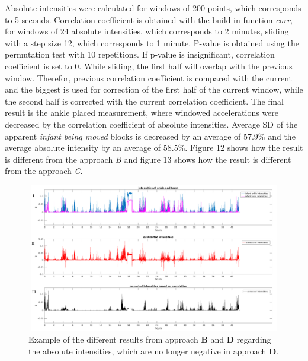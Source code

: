\documentclass{article}
\begin{document}
{Absolute intensities were calculated for windows of 200 points, which corresponds to 5 seconds. Correlation coefficient is obtained with the build-in function \textit{corr}, for windows of 24 absolute intensities, which corresponds to 2 minutes, sliding with a step size 12, which corresponds to 1 minute. P-value is obtained using the permutation test with 10 repetitions. If p-value is insignificant, correlation coefficient is set to 0. While sliding, the first half will overlap with the previous window. Therefor, previous correlation coefficient is compared with the current and the biggest is used for correction of the first half of the current window, while the second half is corrected with the current correlation coefficient. The final result is the ankle placed measurement, where windowed accelerations were decreased by the correlation coefficient of absolute intensities. Average SD of the apparent \textit{infant being moved} blocks is decreased by an average of 57.9\% and the average absolute intensity by an average of 58.5\%. Figure 12 shows how the result is different from the approach \textit{B} and figure 13 shows how the result is different from the approach \textit{C}.
\begin{figure}[h]
\includegraphics[width=15cm, height=6.5cm]{CorrectedIntensitiesCorrelation.png}
\caption{Example of the different results from approach \textbf{B} and \textbf{D} regarding the absolute intensities, which are no longer negative in approach \textbf{D}.}
\end{figure}

}
\end{document}
